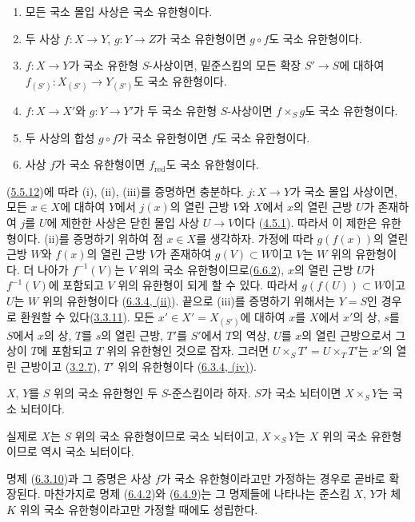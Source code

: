\begin{proposition}[6.6.6]
\label{I.6.6.6-ko}
\begin{enumerate}
  \item[\rm(i)] 모든 국소 몰입 사상은 국소 유한형이다.
  \item[\rm(ii)] 두 사상 $f:X\to Y$, $g:Y\to Z$가 국소 유한형이면
    $g\circ f$도 국소 유한형이다.
  \item[\rm(iii)] $f:X\to Y$가 국소 유한형 $S$-사상이면, 밑준스킴의
    모든 확장 $S'\to S$에 대하여
    $f_{(S')}:X_{(S')}\to Y_{(S')}$도 국소 유한형이다.
  \item[\rm(iv)] $f:X\to X'$와 $g:Y\to Y'$가 두 국소 유한형
    $S$-사상이면 $f\times_S g$도 국소 유한형이다.
  \item[\rm(v)] 두 사상의 합성 $g\circ f$가 국소 유한형이면 $f$도
    국소 유한형이다.
  \item[\rm(vi)] 사상 $f$가 국소 유한형이면 $f_{\mathrm{red}}$도
    국소 유한형이다.
\end{enumerate}
\end{proposition}

(\hyperref[I.5.5.12-ko]{5.5.12})에 따라 (i), (ii), (iii)를 증명하면
충분하다. $j:X\to Y$가 국소 몰입 사상이면, 모든 $x\in X$에 대하여
$Y$에서 $j(x)$의 열린 근방 $V$와 $X$에서 $x$의 열린 근방 $U$가
존재하여 $j$를 $U$에 제한한 사상은 닫힌 몰입 사상 $U\to V$이다
(\hyperref[I.4.5.1-ko]{4.5.1}). 따라서 이 제한은 유한형이다. (ii)를
증명하기 위하여 점 $x\in X$를 생각하자. 가정에 따라 $g(f(x))$의 열린
근방 $W$와 $f(x)$의 열린 근방 $V$가 존재하여 $g(V)\subset W$이고
$V$는 $W$ 위의 유한형이다. 더 나아가 $f^{-1}(V)$는 $V$ 위의 국소
유한형이므로(\hyperref[I.6.6.2-ko]{6.6.2}), $x$의 열린 근방 $U$가
$f^{-1}(V)$에 포함되고 $V$ 위의 유한형이 되게 할 수 있다. 따라서
$g(f(U))\subset W$이고 $U$는 $W$ 위의 유한형이다
(\hyperref[I.6.3.4-ko]{6.3.4, (ii)}). 끝으로 (iii)를 증명하기 위해서는
$Y=S$인 경우로 환원할 수 있다(\hyperref[I.3.3.11-ko]{3.3.11}). 모든
$x'\in X'=X_{(S')}$에 대하여 $x$를 $X$에서 $x'$의 상, $s$를 $S$에서
$x$의 상, $T$를 $s$의 열린 근방, $T'$를 $S'$에서 $T$의 역상, $U$를
$x$의 열린 근방으로서 그 상이 $T$에 포함되고 $T$ 위의 유한형인 것으로
잡자. 그러면 $U\times_S T'=U\times_T T'$는 $x'$의 열린 근방이고
(\hyperref[I.3.2.7-ko]{3.2.7}), $T'$ 위의 유한형이다
(\hyperref[I.6.3.4-ko]{6.3.4, (iv)}).

\begin{corollary}[6.6.7]
\label{I.6.6.7-ko}
$X$, $Y$를 $S$ 위의 국소 유한형인 두 $S$-준스킴이라 하자. $S$가 국소
뇌터이면 $X\times_S Y$는 국소 뇌터이다.
\end{corollary}

실제로 $X$는 $S$ 위의 국소 유한형이므로 국소 뇌터이고,
$X\times_S Y$는 $X$ 위의 국소 유한형이므로 역시 국소 뇌터이다.

\begin{remark}[6.6.8]
\label{I.6.6.8-ko}
명제 (\hyperref[I.6.3.10-ko]{6.3.10})과 그 증명은 사상 $f$가 국소
유한형이라고만 가정하는 경우로 곧바로 확장된다. 마찬가지로 명제
(\hyperref[I.6.4.2-ko]{6.4.2})와 (\hyperref[I.6.4.9-ko]{6.4.9})는 그
명제들에 나타나는 준스킴 $X$, $Y$가 체 $K$ 위의 국소 유한형이라고만
가정할 때에도 성립한다.
\end{remark}
